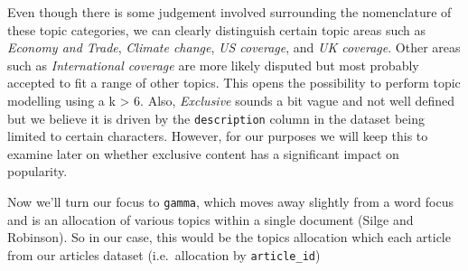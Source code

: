 \documentclass[
]{article}
\begin{document}
Even though there is some judgement involved surrounding the
nomenclature of these topic categories, we can clearly distinguish
certain topic areas such as \emph{Economy and Trade}, \emph{Climate
change}, \emph{US coverage}, and \emph{UK coverage}. Other areas such as
\emph{International coverage} are more likely disputed but most probably
accepted to fit a range of other topics. This opens the possibility to
perform topic modelling using a k \textgreater{} 6. Also,
\emph{Exclusive} sounds a bit vague and not well defined but we believe
it is driven by the \texttt{description} column in the dataset being
limited to certain characters. However, for our purposes we will keep
this to examine later on whether exclusive content has a significant
impact on popularity.

Now we'll turn our focus to \texttt{gamma}, which moves away slightly
from a word focus and is an allocation of various topics within a single
document (Silge and Robinson). So in our case, this would be the topics
allocation which each article from our articles dataset (i.e.~allocation
by \texttt{article\_id})
\end{document}
